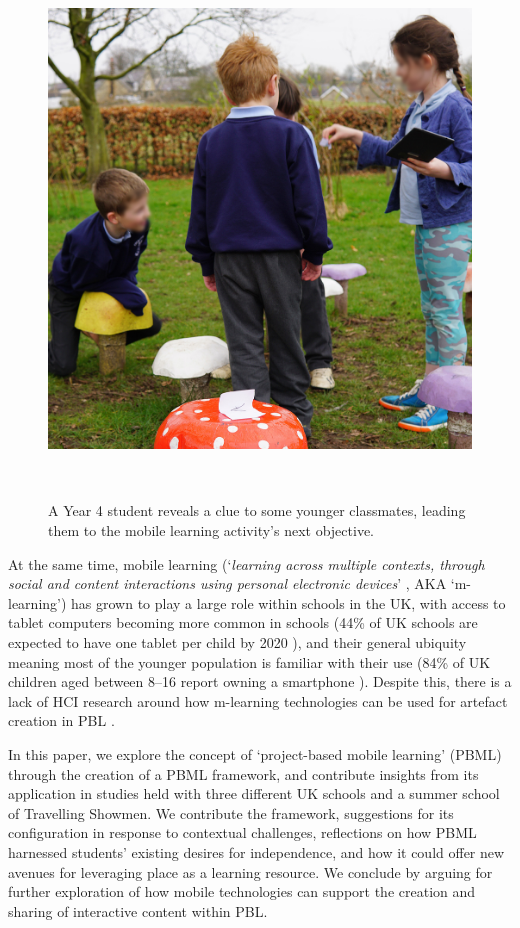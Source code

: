 \begin{figure}
\centering
  \includegraphics[width=0.66\columnwidth]{images/chapter08/mushrooms.jpg}
  \caption{A Year 4 student reveals a clue to some younger classmates, leading them to the mobile learning activity's next objective. }~\label{fig:Mushrooms}
  \vspace{-2.3em}
\end{figure}

At the same time, mobile learning (`\textit{learning across multiple contexts, through social and content interactions using personal electronic devices}' \cite{Crompton2013}, AKA `m-learning') has grown to play a large role within schools in the UK, with access to tablet computers becoming more common in schools (44\% of UK schools are expected to have one tablet per child by 2020 \cite{BritishEducationalSuppliersAssociation2015}), and their general ubiquity meaning most of the younger population is familiar with their use (84\% of UK children aged between 8--16 report owning a smartphone \cite{Statistica2018a}). Despite this, there is a lack of HCI research around how m-learning technologies can be used for artefact creation in PBL \cite{Chan2015}.

In this paper, we explore the concept of `project-based mobile learning' (PBML) through the creation of a PBML framework, and contribute insights from its application in studies held with three different UK schools and a summer school of Travelling Showmen. We contribute the framework, suggestions for its configuration in response to contextual challenges, reflections on how PBML harnessed students' existing desires for independence, and how it could offer new avenues for leveraging place as a learning resource. We conclude by arguing for further exploration of how mobile technologies can support the creation and sharing of interactive content within PBL.

